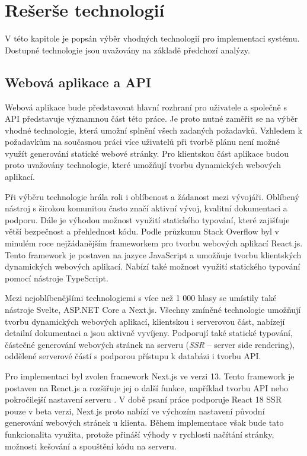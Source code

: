 \chapter{Rešerše technologií}

V této kapitole je popsán výběr vhodných technologií pro implementaci systému. Dostupné technologie jsou uvažovány na základě předchozí analýzy.

\section{Webová aplikace a API}

Webová aplikace bude představovat hlavní rozhraní pro uživatele a společně s API představuje významnou část této práce.
Je proto nutné zaměřit se na výběr vhodné technologie, která umožní splnění všech zadaných požadavků.
Vzhledem k požadavkům na současnou práci více uživatelů při tvorbě plánu není možné využít generování statické webové stránky. Pro klientskou část
aplikace budou proto uvažovány technologie, které umožňují tvorbu dynamických webových aplikací.

Při výběru technologie hrála roli i oblíbenost a žádanost mezi vývojáři. Oblíbený nástroj s širokou komunitou často značí aktivní vývoj, kvalitní dokumentaci
a podporu. Dále je výhodou možnost využití statického typování, které zajišťuje větší bezpečnost a přehlednost kódu. Podle průzkumu Stack Overflow \cite{so_dev_survey} 
byl v minulém roce nejžádanějším frameworkem pro tvorbu webových aplikací React.js. Tento framework je postaven na jazyce JavaScript a umožňuje tvorbu klientských
dynamických webových aplikací. Nabízí také možnost využití statického typování pomocí nástroje TypeScript.

Mezi nejoblíbenějšími technologiemi s více než 1 000 hlasy se umístily také nástroje Svelte, ASP.NET Core a Next.js. Všechny zmíněné technologie umožňují tvorbu dynamických webových aplikací,
klientskou i serverovou část, nabízejí detailní dokumentaci a jsou aktivně vyvíjeny. Podporují také statické typování, částečné generování webových stránek na serveru (\textit{SSR} -- server side rendering),
oddělené serverové částí s podporou přístupu k databázi i tvorbu API.

Pro implementaci byl zvolen framework Next.js ve verzi 13. Tento framework je postaven na React.js a rozšiřuje jej o další funkce, například tvorbu API nebo pokročilejší nastavení serveru \cite{nextjs}.
V době psaní práce podporuje React 18 SSR pouze v beta verzi, Next.js proto nabízí ve výchozím nastavení původní generování webových stránek u klienta.
Během implementace však bude tato funkcionalita využita, protože přináší výhody v rychlosti načítání stránky, možnosti kešování a spouštění kódu na serveru.

